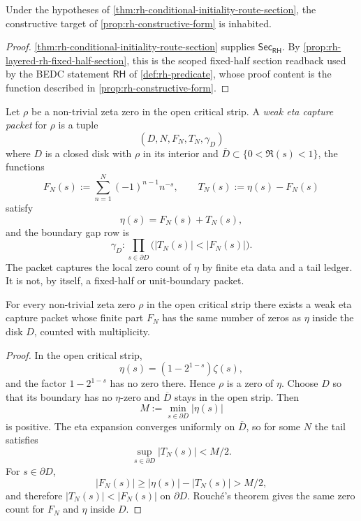 \begin{corollary}
\label{cor:rh-conditional-initiality-extracts-witness}
Under the hypotheses of
\autoref{thm:rh-conditional-initiality-route-section}, the constructive
target of \autoref{prop:rh-constructive-form} is inhabited.
\end{corollary}

\begin{proof}
\autoref{thm:rh-conditional-initiality-route-section} supplies
$\mathsf{Sec}_{\mathsf{RH}}$. By
\autoref{prop:rh-layered-rh-fixed-half-section}, this is the scoped
fixed-half section readback used by the BEDC statement $\mathsf{RH}$ of
\autoref{def:rh-predicate}, whose proof content is the function described in
\autoref{prop:rh-constructive-form}.
\end{proof}

\begin{definition}
\label{def:rh-weak-eta-capture-packet}
Let $\rho$ be a non-trivial zeta zero in the open critical strip. A
\emph{weak eta capture packet} for $\rho$ is a tuple
$$
(D,N,F_N,T_N,\gamma_D)
$$
where $D$ is a closed disk with $\rho$ in its interior and
$\overline D\subset\{0<\Re(s)<1\}$, the functions
$$
F_N(s):=\sum_{n=1}^{N}(-1)^{n-1}n^{-s},
\qquad
T_N(s):=\eta(s)-F_N(s)
$$
satisfy
$$
\eta(s)=F_N(s)+T_N(s),
$$
and the boundary gap row is
$$
\gamma_D:
\prod_{s\in\partial D}
\bigl(|T_N(s)|<|F_N(s)|\bigr).
$$
The packet captures the local zero count of $\eta$ by finite eta data and
a tail ledger. It is not, by itself, a fixed-half or unit-boundary packet.
\end{definition}

\begin{theorem}
\label{thm:rh-weak-eta-capture-local-zero-count}
For every non-trivial zeta zero $\rho$ in the open critical strip there
exists a weak eta capture packet whose finite part $F_N$ has the same
number of zeros as $\eta$ inside the disk $D$, counted with multiplicity.
\end{theorem}

\begin{proof}
In the open critical strip,
$$
\eta(s)=(1-2^{1-s})\zeta(s),
$$
and the factor $1-2^{1-s}$ has no zero there. Hence $\rho$ is a zero of
$\eta$. Choose $D$ so that its boundary has no $\eta$-zero and
$\overline D$ stays in the open strip. Then
$$
M:=\min_{s\in\partial D}|\eta(s)|
$$
is positive. The eta expansion converges uniformly on $\overline D$, so
for some $N$ the tail satisfies
$$
\sup_{s\in\partial D}|T_N(s)|<M/2.
$$
For $s\in\partial D$,
$$
|F_N(s)|
\ge
|\eta(s)|-|T_N(s)|
>
M/2,
$$
and therefore $|T_N(s)|<|F_N(s)|$ on $\partial D$. Rouch\'e's theorem
gives the same zero count for $F_N$ and $\eta$ inside $D$.
\end{proof}

